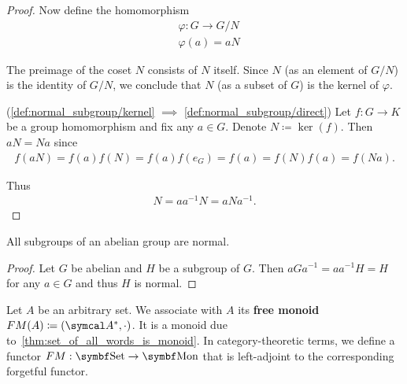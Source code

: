 \begin{proof}
  Now define the homomorphism
  \begin{align*}
    &\varphi: G \to G / N \\
    &\varphi(a) = aN
  \end{align*}

  The preimage of the coset \( N \) consists of \( N \) itself. Since \( N \) (as an element of \( G / N \)) is the identity of \( G / N \), we conclude that \( N \) (as a subset of \( G \)) is the kernel of \( \varphi \).

  (\ref{def:normal_subgroup/kernel} \( \implies \) \ref{def:normal_subgroup/direct}) Let \( f: G \to K \) be a group homomorphism and fix any \( a \in G \). Denote \( N \coloneqq \ker(f) \). Then \( aN = Na \) since
  \begin{align*}
    f(aN)
    =
    f(a) f(N)
    =
    f(a) f(e_G)
    =
    f(a)
    =
    f(N) f(a)
    =
    f(Na).
  \end{align*}

  Thus
  \begin{align*}
    N = aa^{-1}N = aNa^{-1}.
  \end{align*}
\end{proof}

\begin{proposition}\label{thm:abelian_normal_subgroups}
  All subgroups of an abelian group are normal.
\end{proposition}
\begin{proof}
  Let \( G \) be abelian and \( H \) be a subgroup of \( G \). Then \( aGa^{-1} = aa^{-1}H = H \) for any \( a \in G \) and thus \( H \) is normal.
\end{proof}

\begin{definition}\label{def:free_monoid}\cite[306]{Knapp2016BAlg}
  Let \( A \) be an arbitrary set. We associate with \( A \) its \textbf{free monoid} \( FM(A) \coloneqq (\Cal{A}^{*}, \cdot) \). It is a monoid due to~\cref{thm:set_of_all_words_is_monoid}. In category-theoretic terms, we define a functor \( FM: \Bold{Set} \to \Bold{Mon} \) that is left-adjoint to the corresponding forgetful functor.
\end{definition}

